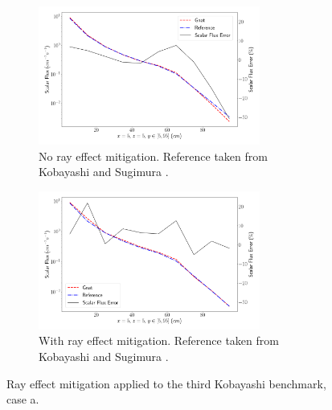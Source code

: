 \begin{figure}[H]
    \centering
    \begin{subfigure}[b]{\textwidth}
        \centering
        \includegraphics[width=0.8\textwidth]{images/verification/rt_kobayashi/kobayashi_3a_no_rt.png}
        \caption{No ray effect mitigation. Reference taken from Kobayashi and Sugimura \cite{kobayashi_benchmarks}.}
        \label{fig:verification:rt:kobayashi_3a:no_rt}
    \end{subfigure}
    \hfill
    \begin{subfigure}[b]{\textwidth}
        \centering
        \includegraphics[width=0.8\textwidth]{images/verification/rt_kobayashi/kobayashi_3a_rt.png}
        \caption{With ray effect mitigation. Reference taken from Kobayashi and Sugimura \cite{kobayashi_benchmarks}.}
        \label{fig:verification:rt:kobayashi_3a:rt}
    \end{subfigure}
    \caption{Ray effect mitigation applied to the third Kobayashi benchmark, case a.}
    \label{fig:verification:rt:kobayashi_3a}
\end{figure}


